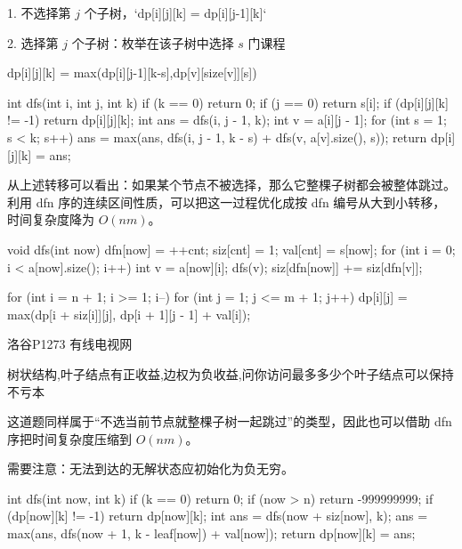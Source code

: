 \documentclass[UTF8,a4paper,11pt]{ctexart}
\newcommand{\topic}[1]{%
  \par\needspace{3\baselineskip}\vspace{0.45em}%
  \noindent{\bfseries\color{Primary}#1}\par\vspace{0.12em}%
}
\begin{document}
1. 不选择第 $j$ 个子树，`dp[i][j][k] = dp[i][j-1][k]`

2. 选择第 $j$ 个子树：枚举在该子树中选择 $s$ 门课程

\begin{CodeBlock}
dp[i][j][k] = max(dp[i][j-1][k-s],dp[v][size[v]][s])
\end{CodeBlock}

\begin{CodeBlock}
int dfs(int i, int j, int k) {
    if (k == 0)
        return 0;
    if (j == 0)
        return s[i];
    if (dp[i][j][k] != -1)
        return dp[i][j][k];
    int ans = dfs(i, j - 1, k);
    int v = a[i][j - 1];
    for (int s = 1; s < k; s++)
        ans = max(ans, dfs(i, j - 1, k - s) + dfs(v, a[v].size(), s));
    return dp[i][j][k] = ans;
}
\end{CodeBlock}

从上述转移可以看出：如果某个节点不被选择，那么它整棵子树都会被整体跳过。利用 dfn 序的连续区间性质，可以把这一过程优化成按 dfn 编号从大到小转移，时间复杂度降为 $O(nm)$。

\begin{CodeBlock}
void dfs(int now) {
    dfn[now] = ++cnt;
    siz[cnt] = 1;
    val[cnt] = s[now];
    for (int i = 0; i < a[now].size(); i++) {
        int v = a[now][i];
        dfs(v);
        siz[dfn[now]] += siz[dfn[v]];
    }
}
\end{CodeBlock}

\begin{CodeBlock}
for (int i = n + 1; i >= 1; i--) {
    for (int j = 1; j <= m + 1; j++) {
        dp[i][j] = max(dp[i + siz[i]][j], dp[i + 1][j - 1] + val[i]);
    }
}
\end{CodeBlock}

洛谷P1273 有线电视网

\topic{有线电视网}

树状结构,叶子结点有正收益,边权为负收益,问你访问最多多少个叶子结点可以保持不亏本

这道题同样属于“不选当前节点就整棵子树一起跳过”的类型，因此也可以借助 dfn 序把时间复杂度压缩到 $O(nm)$。

需要注意：无法到达的无解状态应初始化为负无穷。

\begin{CodeBlock}
int dfs(int now, int k) {
    if (k == 0)
        return 0;
    if (now > n)
        return -999999999;
    if (dp[now][k] != -1)
        return dp[now][k];
    int ans = dfs(now + siz[now], k);
    ans = max(ans, dfs(now + 1, k - leaf[now]) + val[now]);
    return dp[now][k] = ans;
}
\end{CodeBlock}
\end{document}
